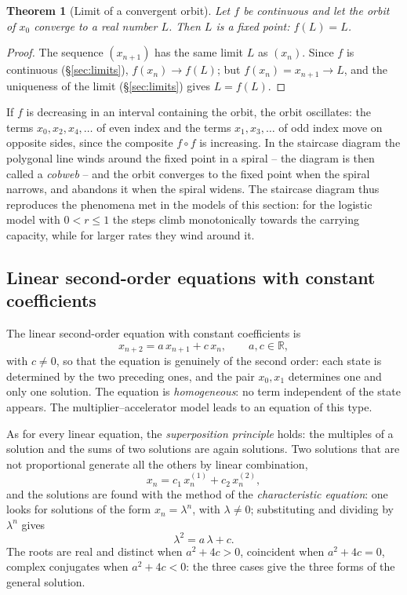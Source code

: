 \documentclass[11pt,a4paper]{article}
\theoremstyle{definition} \newtheorem{definition}{Definition} \theoremstyle{plain} \newtheorem{theorem}{Theorem}
\begin{document}
\begin{theorem}[Limit of a convergent orbit]\label{thm:limit-orbit} Let $f$ be continuous and
let the orbit of $x_0$ converge to a real number $L$. Then $L$ is a fixed
point: $f(L)=L$.
\end{theorem}

\begin{proof} The sequence $(x_{n+1})$ has the same limit $L$ as $(x_n)$.
Since $f$ is continuous (\S\ref{sec:limits}), $f(x_n)\to f(L)$; but $f(x_n)=x_{n+1}\to
L$, and the uniqueness of the limit (\S\ref{sec:limits}) gives $L=f(L)$. \end{proof}

If $f$ is decreasing in an interval containing the orbit, the orbit
oscillates: the terms $x_0, x_2, x_4, \ldots$ of even index and the terms
$x_1, x_3, \ldots$ of odd index move on opposite sides, since the
composite $f\circ f$ is increasing. In the staircase diagram the
polygonal line winds around the fixed point in a spiral -- the diagram is
then called a \emph{cobweb} -- and the orbit converges to the fixed point
when the spiral narrows, and abandons it when the spiral widens. The
staircase diagram thus reproduces the phenomena met in the models of
this section: for the logistic model with $0<r\le 1$ the steps climb
monotonically towards the carrying capacity, while for larger rates they
wind around it.

\subsection{Linear second-order equations with constant coefficients}

The linear second-order equation with constant coefficients is
\[ x_{n+2} = a\,x_{n+1} + c\,x_n, \qquad a, c \in \mathbb{R}, \]
with $c\neq 0$, so that the equation is genuinely of the second order:
each state is determined by the two preceding ones, and the pair
$x_0,x_1$ determines one and only one solution. The equation is
\emph{homogeneous}: no term independent of the state appears. The
multiplier--accelerator model leads to an equation of this type.

As for every linear equation, the \emph{superposition principle} holds:
the multiples of a solution and the sums of two solutions are again
solutions. Two solutions that are not proportional generate all the
others by linear combination,
\[ x_n = c_1\,x^{(1)}_n + c_2\,x^{(2)}_n, \]
and the solutions are found with the method of the \emph{characteristic
equation}: one looks for solutions of the form $x_n=\lambda^n$, with
$\lambda\neq 0$; substituting and dividing by $\lambda^n$ gives
\[ \lambda^2 = a\,\lambda + c. \]
The roots are real and distinct when $a^2+4c>0$, coincident when
$a^2+4c=0$, complex conjugates when $a^2+4c<0$: the three cases give the
three forms of the general solution.
\end{document}
